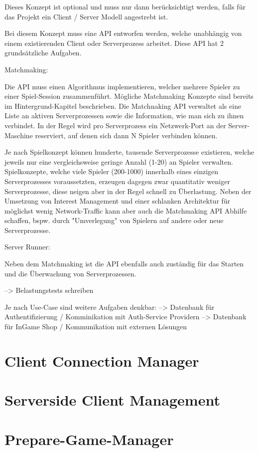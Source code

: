 Dieses Konzept ist optional und muss nur dann berücksichtigt werden, falls für das Projekt ein Client / Server Modell angestrebt ist.

Bei diesem Konzept muss eine API entworfen werden, welche unabhängig von einem existierenden Client oder Serverprozess arbeitet. Diese API hat 2 grundsätzliche Aufgaben. 

Matchmaking:

Die API muss einen Algorithmus implementieren, welcher mehrere Spieler zu einer Spiel-Session zusammenführt. Mögliche Matchmaking Konzepte sind bereits im Hintergrund-Kapitel beschrieben. Die Matchnaking API verwaltet als eine Liste an aktiven Serverprozessen sowie die Information, wie man sich zu ihnen verbindet. In der Regel wird pro Serverprozess ein Netzwerk-Port an der Server-Maschine reserviert, auf denen sich dann N Spieler verbinden können.

Je nach Spielkonzept können hunderte, tausende Serverprozesse existieren, welche jeweils nur eine vergleichsweise geringe Anzahl (1-20) an Spieler verwalten. Spielkonzepte, welche viele Spieler (200-1000) innerhalb eines einzigen Serverprozesses voraussetzten, erzeugen dagegen zwar quantitativ weniger Serverprozesse, diese neigen aber in der Regel schnell zu Überlastung. Neben der Umsetzung von Interest Management und einer schlanken Architektur für möglichst wenig Network-Traffic kann aber auch die Matchmaking API Abhilfe schaffen, bspw. durch "Umverlegung" von Spielern auf andere oder neue Serverprozesse.


Server Runner:

Neben dem Matchmaking ist die API ebenfalls auch zuständig für das Starten und die Überwachung von Serverprozessen. 

--> Belastungstests schreiben

Je nach Use-Case sind weitere Aufgaben denkbar:
--> Datenbank für Authentifizierung / Komminikation mit Auth-Service Providern
--> Datenbank für InGame Shop / Kommunikation mit externen Lösungen

\section{Client Connection Manager}

\section{Serverside Client Management}

\section{Prepare-Game-Manager}

